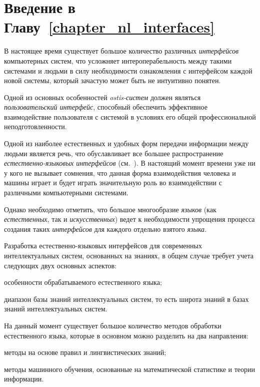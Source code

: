 \bigskip

\section*{Введение в Главу~\ref{chapter_nl_interfaces}}

В настоящее время существует большое количество различных \textit{интерфейсов} компьютерных систем, что усложняет интероперабельность между такими системами и людьми в силу необходимости ознакомления с интерфейсом каждой новой системы, который зачастую может быть не интуитивно понятен.

Одной из основных особенностей \textit{ostis-систем} должен являться \textit{пользовательский интерфейс}, способный обеспечить эффективное взаимодействие пользователя с системой в условиях его общей профессиональной неподготовленности.

Одной из наиболее естественных и удобных форм передачи информации между людьми является речь, что обуславливает все большее распространение \textit{естественно-языковых интерфейсов} (см.~).
В настоящий момент времени уже ни у кого не вызывает сомнения, что данная форма взаимодействия человека и машины играет и будет играть значительную роль во взаимодействии с различными компьютерными системами.

Однако необходимо отметить, что большое многообразие \textit{языков} (как \textit{естественных}, так и \textit{искусственных}) ведет к необходимости упрощения процесса создания таких \textit{интерфейсов} для каждого отдельно взятого \textit{языка}.

Разработка естественно-языковых интерфейсов для современных интеллектуальных систем, основанных на знаниях, в общем случае требует учета следующих двух основных аспектов:
\begin{textitemize}
	\item особенности обрабатываемого естественного языка;
	\item диапазон базы знаний интеллектуальных систем, то есть широта знаний в базах знаний интеллектуальных систем.
\end{textitemize}

На данный момент существует большое количество методов обработки естественного языка, которые в основном можно разделить на два направления:
\begin{textitemize}
	\item методы на основе правил и лингвистических знаний;
	\item методы машинного обучения, основанные на математической статистике и теории информации.
\end{textitemize}

